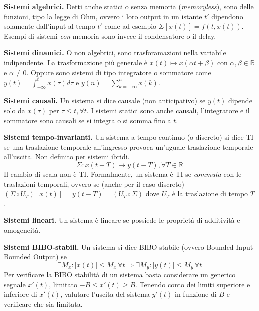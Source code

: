 \documentclass[a4paper,portrait,12pt]{article}
\theoremstyle{definition}
\begin{document}
\textbf{Sistemi algebrici.} Detti anche statici o senza memoria (\textit{memoryless}), sono delle funzioni, 
tipo la legge di Ohm, ovvero i loro output in un istante $t'$ dipendono solamente dall'input al tempo $t'$
come ad esempio $\Sigma[x(t)] = f(t,x(t))$.\\ 
Esempi di sistemi \textit{con} memoria sono invece il condensatore o il delay.
\bigskip

\textbf{Sistemi dinamici.} O non algebrici, sono trasforamazioni nella variabile indipendente. 
La trasformazione più generale è $x(t) \mapsto x(\alpha t + \beta)$ con $\alpha,\beta \in \mathbb{R}$ e 
$\alpha \neq 0$. Oppure sono sistemi di tipo integratore o sommatore come $y(t) = \int_{-\infty}^t 
x(\tau)d\tau$ e $y(n) = \sum_{k=-\infty}^n x(k)$.
\bigskip

\textbf{Sistemi causali.} Un sistema si dice causale (non anticipativo) se $y(t)$ dipende 
solo da $x(\tau)$ per $\tau \le t, \forall t$. I sistemi statici sono anche causali, l'integratore e il 
sommatore sono causali se si integra o si somma fino a $t$.
\bigskip

\textbf{Sistemi tempo-invarianti.} Un sistema a tempo continuo (o discreto) si dice TI se una traslazione 
temporale all'ingresso provoca un'uguale traslazione temporale all'uscita. Non definito per sistemi ibridi. 
\begin{equation}
\Sigma :x(t-T) \mapsto y(t-T),\forall T \in \mathbb{R}
\end{equation}
Il cambio di scala non è TI. Formalmente, un sistema è TI se \textit{commuta} con le traslazioni temporali, 
ovvero se (anche per il caso discreto) $(\Sigma \circ U_T)[x(t)] = y(t - T) = (U_T \circ \Sigma)$ 
dove $U_T$ è la traslazione di tempo $T$.
\bigskip

\textbf{Sistemi lineari.} Un sistema è lineare se possiede le proprietà di additività e omogeneità.
\bigskip

\textbf{Sistemi BIBO-stabili.} Un sistema si dice BIBO-stabile (ovvero Bounded Input Bounded Output) se
\begin{equation}
\exists M_x : \left|x(t)\right| \le M_x \, \forall t \Rightarrow \exists M_y : \left|y(t)\right| 
\le M_y \, \forall t
\end{equation}
Per verificare la BIBO stabilità di un sistema basta considerare un generico segnale $x'(t)$, limitato
$-B \le x'(t) \ge B$. Tenendo conto dei limiti superiore e inferiore di $x'(t)$, valutare l'uscita del
sistema $y'(t)$ in funzione di $B$ e verificare che sia limitata.
\bigskip
\end{document}
